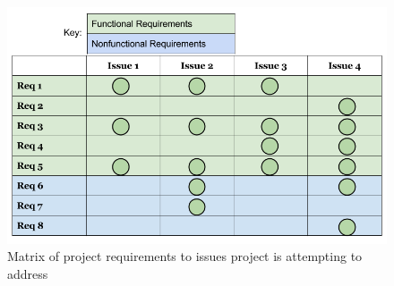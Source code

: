 \begin{figure}[H]
  \centering
      \includegraphics[width=1\textwidth]{images/issues_to_req_matrix.png}
  \caption{Matrix of project requirements to issues project is attempting to
address}
\end{figure}
